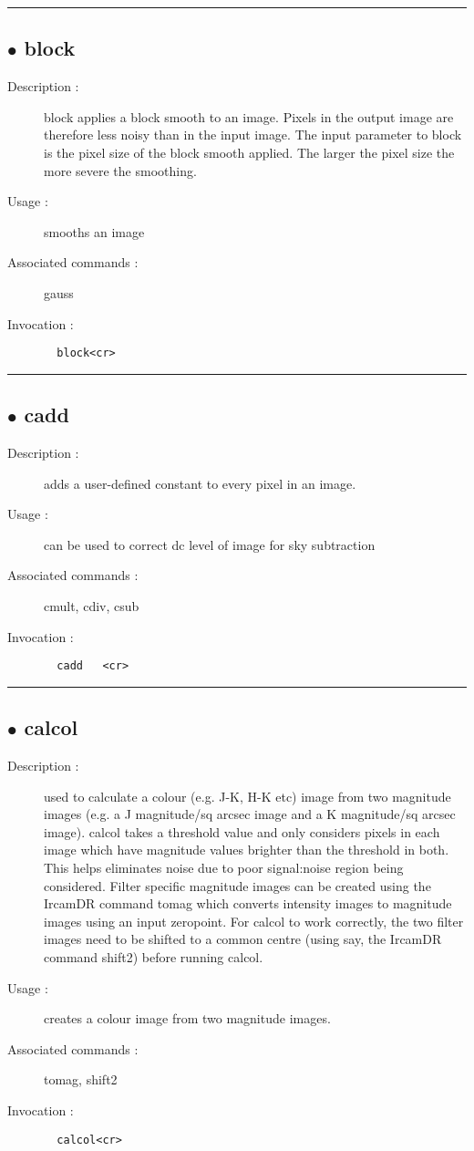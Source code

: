 \hrule \subsection*{$\bullet$ block}
\begin{description}
\item[Description :] block applies a block smooth to an image.  Pixels in the output
image are therefore less noisy than in the input image.  The input
parameter to block is the pixel size of the block smooth applied.  The
larger the pixel size the more severe the smoothing.
\item[Usage :] smooths an image
\item[Associated commands :] gauss
\item[Invocation :]

\verb+  block<cr> +\end{description}

\hrule \subsection*{$\bullet$ cadd}
\begin{description}
\item[Description :] adds a user-defined constant to every pixel in an image.  
\item[Usage :] can be used to correct dc level of image for sky subtraction
\item[Associated commands :] cmult, cdiv, csub
\item[Invocation :]

\verb+  cadd   <cr> +\end{description}

\hrule \subsection*{$\bullet$ calcol}
\begin{description}
\item[Description :] used to calculate a colour (e.g. J-K, H-K etc) image from two
magnitude images (e.g. a J magnitude/sq arcsec image and a K magnitude/sq
arcsec image).  calcol takes a threshold value and only considers pixels
in each image which have magnitude values brighter than the threshold in
both.  This helps eliminates noise due to poor signal:noise region being
considered.  Filter specific magnitude images can be created using the
IrcamDR command tomag which converts intensity images to magnitude images
using an input zeropoint.  For calcol to work correctly, the two filter
images need to be shifted to a common centre (using say, the IrcamDR
command shift2) before running calcol.
\item[Usage :] creates a colour image from two magnitude images.
\item[Associated commands :] tomag, shift2
\item[Invocation :]

\verb+  calcol<cr> +\end{description}

